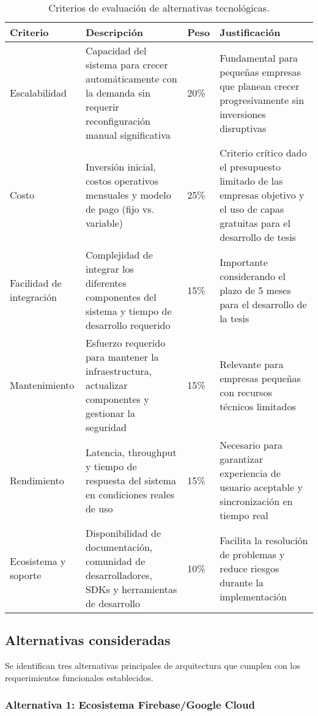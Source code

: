 \begin{table}[H]
\centering
\caption{Criterios de evaluación de alternativas tecnológicas.}
\label{tab:criterios_evaluacion}
\begin{tabular}{@{}p{2.5cm}p{5cm}p{1.5cm}p{4cm}@{}}
\toprule
\textbf{Criterio} & \textbf{Descripción} & \textbf{Peso} & \textbf{Justificación} \\
\midrule
Escalabilidad & Capacidad del sistema para crecer automáticamente con la demanda sin requerir reconfiguración manual significativa & 20\% & Fundamental para pequeñas empresas que planean crecer progresivamente sin inversiones disruptivas \\
\midrule
Costo & Inversión inicial, costos operativos mensuales y modelo de pago (fijo vs. variable) & 25\% & Criterio crítico dado el presupuesto limitado de las empresas objetivo y el uso de capas gratuitas para el desarrollo de tesis \\
\midrule
Facilidad de integración & Complejidad de integrar los diferentes componentes del sistema y tiempo de desarrollo requerido & 15\% & Importante considerando el plazo de 5 meses para el desarrollo de la tesis \\
\midrule
Mantenimiento & Esfuerzo requerido para mantener la infraestructura, actualizar componentes y gestionar la seguridad & 15\% & Relevante para empresas pequeñas con recursos técnicos limitados \\
\midrule
Rendimiento & Latencia, throughput y tiempo de respuesta del sistema en condiciones reales de uso & 15\% & Necesario para garantizar experiencia de usuario aceptable y sincronización en tiempo real \\
\midrule
Ecosistema y soporte & Disponibilidad de documentación, comunidad de desarrolladores, SDKs y herramientas de desarrollo & 10\% & Facilita la resolución de problemas y reduce riesgos durante la implementación \\
\bottomrule
\end{tabular}
\end{table}

\subsection{Alternativas consideradas}

Se identifican tres alternativas principales de arquitectura que cumplen con los requerimientos funcionales establecidos.

\subsubsection{Alternativa 1: Ecosistema Firebase/Google Cloud}

